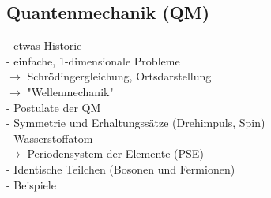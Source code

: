 \subsection{Quantenmechanik (QM)}
	- etwas Historie\\
	- einfache, 1-dimensionale Probleme\\
	$\rightarrow$ Schr\"odingergleichung, Ortsdarstellung\\
	$\rightarrow$ "Wellenmechanik"\\
	- Postulate der QM\\
	- Symmetrie und Erhaltungss\"atze (Drehimpuls, Spin)\\
	- Wasserstoffatom\\
	$\rightarrow$ Periodensystem der Elemente (PSE)\\
	- Identische Teilchen (Bosonen und Fermionen)\\
	- Beispiele